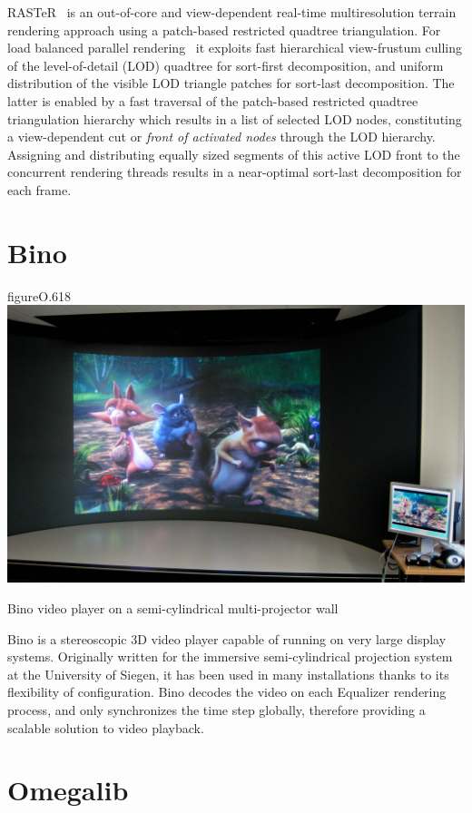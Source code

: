 RASTeR~\cite{BGP:09} is an out-of-core and view-dependent real-time
multiresolution terrain rendering approach using a patch-based restricted
quadtree triangulation. For load balanced parallel rendering~\cite{GMBP:10} it
exploits fast hierarchical view-frustum culling of the level-of-detail (LOD)
quadtree for sort-first decomposition, and uniform distribution of the visible
LOD triangle patches for sort-last decomposition. The latter is enabled by a
fast traversal of the patch-based restricted quadtree triangulation hierarchy
which results in a list of selected LOD nodes, constituting a view-dependent cut
or \emph{front of activated nodes} through the LOD hierarchy. Assigning and
distributing equally sized segments of this active LOD front to the concurrent
rendering threads results in a near-optimal sort-last decomposition for each
frame.

\section{Bino}

\begin{wrapfloat}{figure}{O}{.618\textwidth}
  \includegraphics[width=.618\textwidth]{images/bino}
  {\caption{\label{fBino}Bino video player on a semi-cylindrical multi-projector wall}}
\end{wrapfloat}

Bino is a stereoscopic 3D video player capable of running on very large display
systems. Originally written for the immersive semi-cylindrical projection
system at the University of Siegen, it has been used in many installations
thanks to its flexibility of configuration. Bino decodes the video on each
Equalizer rendering process, and only synchronizes the time step globally,
therefore providing a scalable solution to video playback.

\section{Omegalib}

